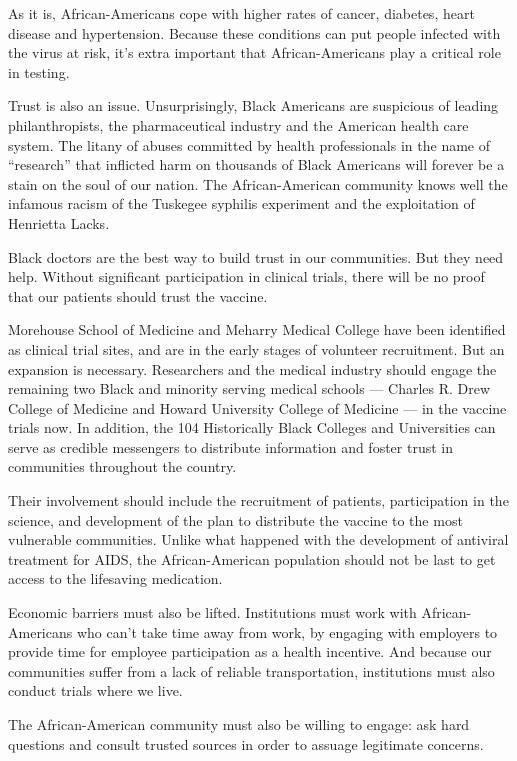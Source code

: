 As it is, African-Americans cope with higher rates of cancer, diabetes,
heart disease and hypertension. Because these conditions can put people
infected with the virus at risk, it's extra important that
African-Americans play a critical role in testing.

Trust is also an issue. Unsurprisingly, Black Americans are suspicious
of leading philanthropists, the pharmaceutical industry and the American
health care system. The litany of abuses committed by health
professionals in the name of ``research'' that inflicted harm on
thousands of Black Americans will forever be a stain on the soul of our
nation. The African-American community knows well the infamous racism of
the Tuskegee syphilis experiment and the exploitation of Henrietta
Lacks.

Black doctors are the best way to build trust in our communities. But
they need help. Without significant participation in clinical trials,
there will be no proof that our patients should trust the vaccine.

Morehouse School of Medicine and Meharry Medical College have been
identified as clinical trial sites, and are in the early stages of
volunteer recruitment. But an expansion is necessary. Researchers and
the medical industry should engage the remaining two Black and minority
serving medical schools --- Charles R. Drew College of Medicine and
Howard University College of Medicine --- in the vaccine trials now. In
addition, the 104 Historically Black Colleges and Universities can serve
as credible messengers to distribute information and foster trust in
communities throughout the country.

Their involvement should include the recruitment of patients,
participation in the science, and development of the plan to distribute
the vaccine to the most vulnerable communities. Unlike what happened
with the development of antiviral treatment for AIDS, the
African-American population should not be last to get access to the
lifesaving medication.

Economic barriers must also be lifted. Institutions must work with
African-Americans who can't take time away from work, by engaging with
employers to provide time for employee participation as a health
incentive. And because our communities suffer from a lack of reliable
transportation, institutions must also conduct trials where we live.

The African-American community must also be willing to engage: ask hard
questions and consult trusted sources in order to assuage legitimate
concerns.

